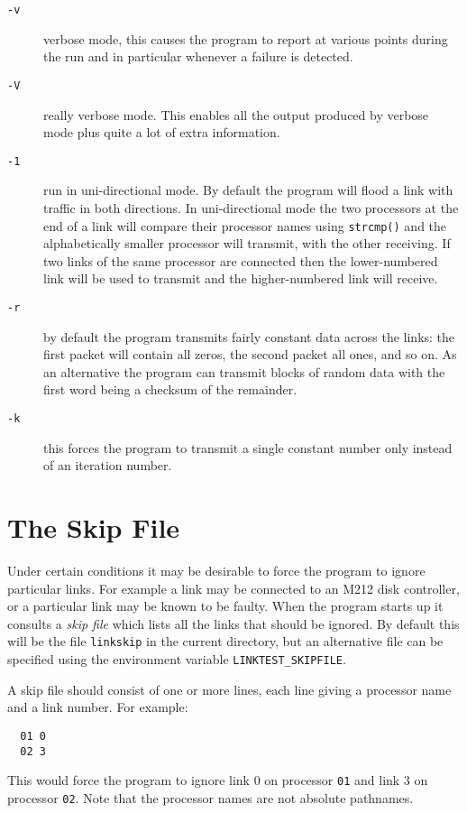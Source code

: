 \begin{description}
\item [{\tt -v}] verbose mode, this causes the program to report at
various points during the run and in particular whenever a failure is
detected.
\item [{\tt -V}] really verbose mode. This enables all the output
produced by verbose mode plus quite a lot of extra information.
\item [{\tt -1}] run in uni-directional mode. By default the program will
flood a link with traffic in both directions. In uni-directional
mode the two processors at the end of a link will compare their processor
names using {\tt strcmp()} and the alphabetically smaller processor
will transmit, with the other receiving. If two links of the same
processor are connected then the lower-numbered link will be used to
transmit and the higher-numbered link will receive.
\item [{\tt -r}] by default the program transmits fairly constant data across
the links: the first packet will contain all zeros, the second packet
all ones, and so on. As an alternative the program can transmit blocks
of random data with the first word being a checksum of the remainder.
\item [{\tt -k}] this forces the program to transmit a single constant number
only instead of an iteration number.
\end{description}

\section{The Skip File}

Under certain conditions it may be desirable to force the program to
ignore particular links. For example a link may be connected to an
M212 disk controller, or a particular link may be known to be faulty.
When the program starts up it consults a {\em skip file} which lists
all the links that should be ignored. By default this will be the file
{\tt linkskip} in the current directory, but an alternative file can
be specified using the environment variable \verb+LINKTEST_SKIPFILE+.

A skip file should consist of one or more lines, each line giving a
processor name and a link number. For example:

\begin{verbatim}
  01 0
  02 3
\end{verbatim}

This would force the program to ignore link 0 on processor {\tt 01} and link 3
on processor {\tt 02}. Note that the processor names are not absolute
pathnames.

